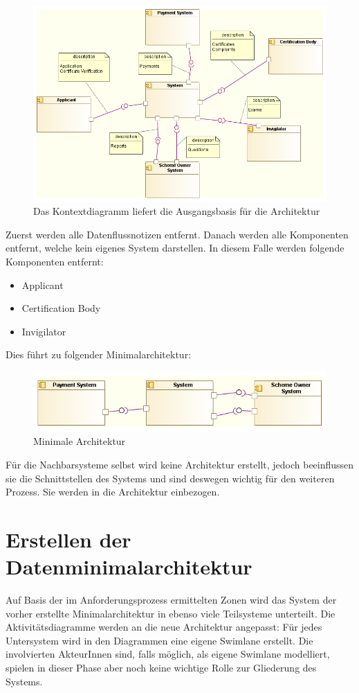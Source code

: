 \begin{figure}[H]
    \centering
    \includegraphics[scale=0.5]{uml/context.png}
    \caption{Das Kontextdiagramm liefert die Ausgangsbasis für die Architektur}
\end{figure}

Zuerst werden alle Datenflussnotizen entfernt. Danach werden alle Komponenten entfernt, welche kein eigenes System darstellen. In diesem Falle werden folgende Komponenten entfernt:

\begin{itemize}
  \item Applicant
  \item Certification Body
  \item Invigilator
\end{itemize}

Dies führt zu folgender Minimalarchitektur:

\begin{figure}[H]
    \centering
    \includegraphics[scale=0.7]{uml/minimalarch.png}
    \caption{Minimale Architektur}
\end{figure}

Für die Nachbarsysteme selbst wird keine Architektur erstellt, jedoch beeinflussen sie die Schnittstellen des Systems und sind deswegen wichtig für den weiteren Prozess. Sie werden in die Architektur einbezogen.

\section{Erstellen der Datenminimalarchitektur}
Auf Basis der im Anforderungsprozess ermittelten Zonen wird das System der vorher erstellte Minimalarchitektur in ebenso viele Teilsysteme unterteilt. Die Aktivitätsdiagramme werden an die neue Architektur angepasst: Für jedes Untersystem wird in den Diagrammen eine eigene Swimlane erstellt. Die involvierten AkteurInnen sind, falls möglich, als eigene Swimlane modelliert, spielen in dieser Phase aber noch keine wichtige Rolle zur Gliederung des Systems.


